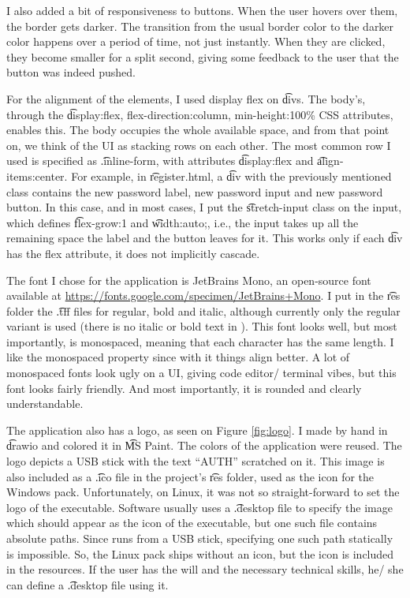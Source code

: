 I also added a bit of responsiveness to buttons.
When  the user hovers over them, the border gets darker.
The transition from the usual border color to the darker color happens over a period of time, not just instantly.
When they are clicked, they become smaller for a split second, giving some feedback to the user that the button was indeed pushed.

For the alignment of the elements, I used display flex on \t{div}s.
The body's, through the \t{display:flex, flex-direction:column, min-height:100\%} CSS attributes, enables this.
The body occupies the whole available space, and from that point on, we think of the UI as stacking rows on each other.
The most common row I used is specified as \t{.inline-form}, with attributes \t{display:flex} and \t{align-items:center}.
For example, in \t{register.html}, a \t{div} with the previously mentioned class contains the new password label, new password input and new password button.
In this case, and in most cases, I put the \t{stretch-input} class on the input, which defines \t{flex-grow:1} and \t{width:auto;}, i.e., the input takes up all the remaining space the label and the button leaves for it.
This works only if each \t{div} has the flex attribute, it does not implicitly cascade.

The font I chose for the application is JetBrains Mono, an open-source font available at \url{https://fonts.google.com/specimen/JetBrains+Mono}.
I put in the \t{res} folder the \t{.tff} files for regular, bold and italic, although currently only the regular variant is used (there is no italic or bold text in \app{}).
This font looks well, but most importantly, is monospaced, meaning that each character has the same length.
I like the monospaced property since with it things align better.
A lot of monospaced fonts look ugly on a UI, giving code editor/ terminal vibes, but this font looks fairly friendly.
And most importantly, it is rounded and clearly understandable.

The application also has a logo, as seen on Figure \ref{fig:logo}.
I made by hand in \t{drawio} and colored it in \t{MS Paint}.
The colors of the application were reused.
The logo depicts a USB stick with the text ``AUTH'' scratched on it.
This image is also included as a \t{.ico} file in the project's \t{res} folder, used as the icon for the Windows pack.
Unfortunately, on Linux, it was not so straight-forward to set the logo of the executable.
Software usually uses a \t{.desktop} file to specify the image which should appear as the icon of the executable, but one such file contains absolute paths.
Since \app{} runs from a USB stick, specifying one such path statically is impossible.
So, the Linux pack ships without an icon, but the icon is included in the resources.
If the user has the will and the necessary technical skills, he/ she can define a \t{.desktop} file using it.

